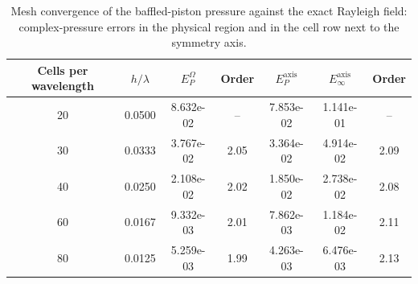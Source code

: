 \begin{table}[htbp]
\centering
\begin{tabular}{ccccccc}
\hline
Cells per wavelength & $h/\lambda$ & $E_P^{\Omega}$ & Order & $E_P^{\mathrm{axis}}$ & $E_\infty^{\mathrm{axis}}$ & Order \\
\hline
20 & 0.0500 & 8.632e-02 & -- & 7.853e-02 & 1.141e-01 & -- \\
30 & 0.0333 & 3.767e-02 & 2.05 & 3.364e-02 & 4.914e-02 & 2.09 \\
40 & 0.0250 & 2.108e-02 & 2.02 & 1.850e-02 & 2.738e-02 & 2.08 \\
60 & 0.0167 & 9.332e-03 & 2.01 & 7.862e-03 & 1.184e-02 & 2.11 \\
80 & 0.0125 & 5.259e-03 & 1.99 & 4.263e-03 & 6.476e-03 & 2.13 \\
\hline
\end{tabular}
\caption{Mesh convergence of the baffled-piston pressure against the exact Rayleigh field: complex-pressure errors in the physical region and in the cell row next to the symmetry axis.}
\label{tab:pistonConvergence}
\end{table}

